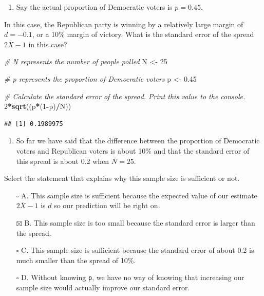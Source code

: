 \documentclass[
]{article}
\newenvironment{Shaded}{\begin{snugshade}}{\end{snugshade}}
\newcommand{\CommentTok}[1]{\textcolor[rgb]{0.56,0.35,0.01}{\textit{#1}}}
\newcommand{\DecValTok}[1]{\textcolor[rgb]{0.00,0.00,0.81}{#1}}
\newcommand{\FloatTok}[1]{\textcolor[rgb]{0.00,0.00,0.81}{#1}}
\newcommand{\KeywordTok}[1]{\textcolor[rgb]{0.13,0.29,0.53}{\textbf{#1}}}
\newcommand{\NormalTok}[1]{#1}
\newcommand{\OperatorTok}[1]{\textcolor[rgb]{0.81,0.36,0.00}{\textbf{#1}}}
\newcommand{\StringTok}[1]{\textcolor[rgb]{0.31,0.60,0.02}{#1}}
\providecommand{\tightlist}{%
  \setlength{\itemsep}{0pt}\setlength{\parskip}{0pt}}
\begin{document}
\begin{enumerate}
\def\labelenumi{\arabic{enumi}.}
\setcounter{enumi}{8}
\tightlist
\item
  Say the actual proportion of Democratic voters is \(p = 0.45\).
\end{enumerate}

In this case, the Republican party is winning by a relatively large
margin of \(d = -0.1\), or a 10\% margin of victory. What is the
standard error of the spread \(2 \overline{X} − 1\) in this case?

\begin{Shaded}
\begin{Highlighting}[]
\CommentTok{\# \textasciigrave{}N\textasciigrave{} represents the number of people polled}
\NormalTok{N \textless{}{-}}\StringTok{ }\DecValTok{25}

\CommentTok{\# \textasciigrave{}p\textasciigrave{} represents the proportion of Democratic voters}
\NormalTok{p \textless{}{-}}\StringTok{ }\FloatTok{0.45}

\CommentTok{\# Calculate the standard error of the spread. Print this value to the console.}
\DecValTok{2}\OperatorTok{*}\KeywordTok{sqrt}\NormalTok{((p}\OperatorTok{*}\NormalTok{(}\DecValTok{1}\OperatorTok{{-}}\NormalTok{p)}\OperatorTok{/}\NormalTok{N))}
\end{Highlighting}
\end{Shaded}

\begin{verbatim}
## [1] 0.1989975
\end{verbatim}

\begin{enumerate}
\def\labelenumi{\arabic{enumi}.}
\setcounter{enumi}{9}
\tightlist
\item
  So far we have said that the difference between the proportion of
  Democratic voters and Republican voters is about 10\% and that the
  standard error of this spread is about 0.2 when \(N = 25\).
\end{enumerate}

Select the statement that explains why this sample size is sufficient or
not.

\begin{itemize}
\tightlist
\item[$\square$]
  A. This sample size is sufficient because the expected value of our
  estimate \(2 \overline{X} − 1\) is \(d\) so our prediction will be
  right on.
\item[$\boxtimes$]
  B. This sample size is too small because the standard error is larger
  than the spread.
\item[$\square$]
  C. This sample size is sufficient because the standard error of about
  0.2 is much smaller than the spread of 10\%.
\item[$\square$]
  D. Without knowing \texttt{p}, we have no way of knowing that
  increasing our sample size would actually improve our standard error.
\end{itemize}
\end{document}
